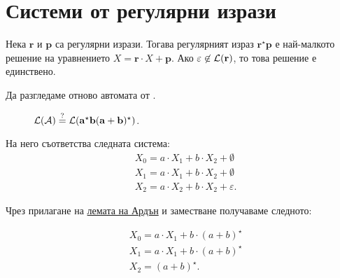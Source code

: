 \section{Системи от регулярни изрази}

\begin{lemma}[Ардън]
  \label{lem:regular:system:arden}
  Нека $\mathbf{r}$  и $\mathbf{p}$ са регулярни изрази.
  Тогава регулярният израз $\mathbf{r}^\star \mathbf{p}$ е най-малкото решение на уравнението $X = \mathbf{r} \cdot X + \mathbf{p}$.
  Ако $\varepsilon  \not \in \mathcal{L}(\mathbf{r})$, то това решение е единствено.
\end{lemma}

Да разгледаме отново автомата от .

\begin{figure}[H]
  \begin{center}
  \end{center}
  \caption{$\mathcal{L}(\mathcal{A}) \stackrel{?}{=} \mathcal{L}(\mathbf{a^\star b(a+b)^\star})$.}
\end{figure}

На него съответства следната система:
\begin{align*}
  & X_0 = a \cdot X_1 + b \cdot X_2 + \emptyset\\
  & X_1 = a \cdot X_1 + b \cdot X_2 + \emptyset\\
  & X_2 = a \cdot X_2 + b \cdot X_2 + \varepsilon.
\end{align*}

Чрез прилагане на \hyperref[lem:regular:system:arden]{лемата на Ардън} и заместване получаваме следното:

\begin{align*}
  & X_0 = a \cdot X_1 + b \cdot (a+b)^\star\\
  & X_1 = a \cdot X_1 + b \cdot (a+b)^\star\\
  & X_2 = (a+b)^\star.
\end{align*}

